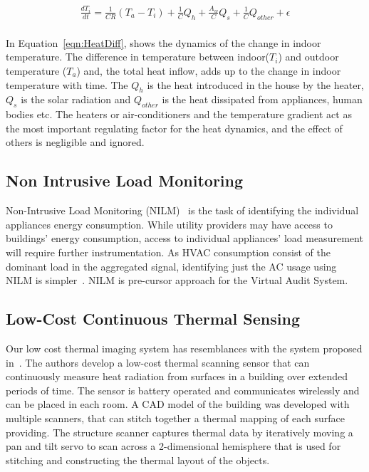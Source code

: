  \begin{eqnarray}\label{eqn:HeatDiff}
 \frac{dT_i}{dt} = \frac{1}{C  R} (T_a-T_i) + \frac{1}{C}Q_{h} + \frac{A_w}{C}Q_s + \frac{1}{C}Q_{other} + \epsilon \nonumber \\
 \end{eqnarray}  

  In Equation~\ref{eqn:HeatDiff}, shows the dynamics of the change in indoor temperature. The difference in temperature between indoor($T_i$) and outdoor temperature ($T_a$) and, the total heat inflow, adds up to the change in indoor temperature with time. The $Q_h$ is the heat introduced in the house by the heater, $Q_s$ is the solar radiation and $Q_{other}$ is the heat dissipated from appliances, human bodies etc. The heaters or air-conditioners and the temperature gradient act as the most important regulating factor for the heat dynamics, and the effect of others is negligible and ignored. 
 
 \subsection{Non Intrusive Load Monitoring} 
 
 Non-Intrusive Load Monitoring (NILM)~\cite{NILM} is the task of identifying the individual appliances energy consumption. While utility providers may have access to buildings' energy consumption, access to individual appliances' load measurement will require further instrumentation. As HVAC consumption consist of the dominant load in the aggregated signal, identifying just the AC usage using NILM is simpler~\cite{NILMAC}. NILM is pre-cursor approach for the Virtual Audit System.  



 \subsection{Low-Cost Continuous Thermal Sensing}
 
 Our low cost thermal imaging system has resemblances with the system proposed in~\cite{IRdevice}. The authors develop a low-cost thermal scanning sensor that can continuously measure heat radiation from surfaces in a building over extended periods of time. The sensor is battery operated and communicates wirelessly and can be placed in each room. A CAD model of the building was developed with multiple scanners, that can stitch together a thermal mapping of each surface providing. The structure scanner captures thermal data by iteratively moving a pan and tilt servo to scan across a 2-dimensional hemisphere that is used for stitching and constructing the thermal layout of the objects.